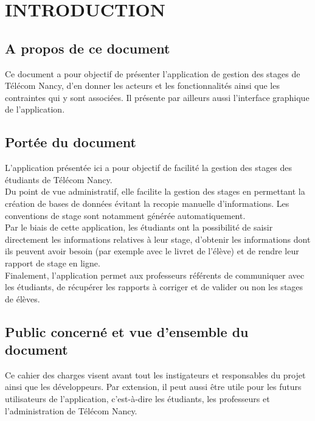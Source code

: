 \documentclass{scrreprt}
\begin{document}
\chapter{INTRODUCTION}

\section{A propos de ce document}
\hspace{1cm}Ce document a pour objectif de présenter l'application de gestion des stages de Télécom Nancy, d'en donner les acteurs et les fonctionnalités ainsi que les contraintes qui y sont associées. Il présente par ailleurs aussi l'interface graphique de l'application.

\section{Portée du document}
\hspace{1cm}L'application présentée ici a pour objectif de facilité la gestion des stages des étudiants de Télécom Nancy.\\

\hspace{0.6cm}Du point de vue administratif, elle facilite la gestion des stages en permettant la création de bases de données évitant la recopie manuelle d'informations. Les conventions de stage sont notamment générée automatiquement.\\

\hspace{0.6cm}Par le biais de cette application, les étudiants ont la possibilité de saisir directement les informations relatives à leur stage, d'obtenir les informations dont ils peuvent avoir besoin (par exemple avec le livret de l'élève) et de rendre leur rapport de stage en ligne.\\

\hspace{0.6cm}Finalement, l'application permet aux professeurs référents de communiquer avec les étudiants, de récupérer les rapports à corriger et de valider ou non les stages de élèves.

\section{Public concerné et vue d'ensemble du document }

\hspace{1cm}Ce cahier des charges visent avant tout les instigateurs et responsables du projet ainsi que les développeurs. Par extension, il peut aussi être utile pour les futurs utilisateurs de l'application, c'est-à-dire les étudiants, les professeurs et l'administration de Télécom Nancy.\\
\end{document}
